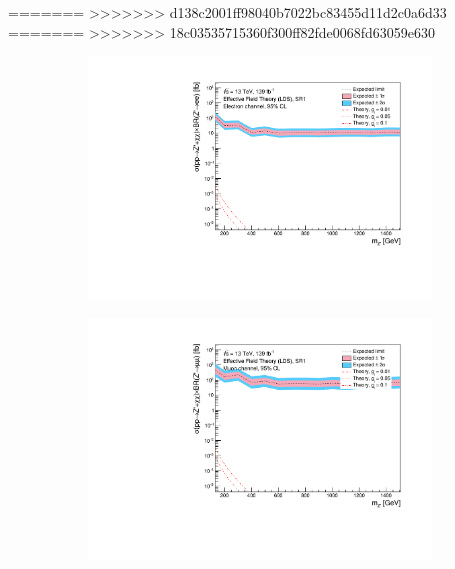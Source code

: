 \documentclass[12pt, a4paper]{book}
\begin{document}
=======
>>>>>>> d138c2001ff98040b7022bc83455d11d2c0a6d33
=======
>>>>>>> 18c03535715360f300ff82fde0068fd63059e630
\begin{figure}[!ht]
	\centering
	\begin{subfigure}[b]{0.49\textwidth}
      \centering
      \includegraphics[width=1\textwidth]{Limits/Model_independent/50-100/EFT_LDS/mass_exclusion_ee.pdf}
   \end{subfigure}
   \hfill
   \begin{subfigure}[b]{0.49\textwidth}
      \centering
      \includegraphics[width=1\textwidth]{Limits/Model_independent/50-100/EFT_LDS/mass_exclusion_uu.pdf}
   \end{subfigure}
   \hfill
   \begin{subfigure}[b]{0.49\textwidth}
      \centering

\end{subfigure}
\end{figure}
\end{document}
